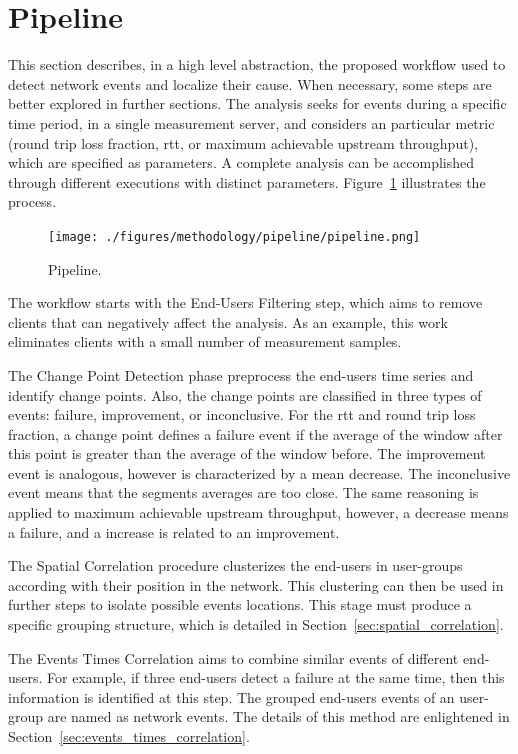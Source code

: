 \section{Pipeline}

This section describes, in a high level abstraction, the proposed workflow
used to detect network events and localize their cause. When necessary, some
steps are better explored in further sections.
The analysis seeks for events during a specific time period, in a single
measurement server, and considers an
particular metric (round trip loss fraction, \gls*{rtt}, or maximum achievable
upstream throughput),
which are specified as parameters.
A complete analysis can be accomplished through different
executions with distinct parameters.
Figure~\ref{fig:pipeline} illustrates the process.

\begin{figure}[H]
    \centering
    \texttt{[image: ./figures/methodology/pipeline/pipeline.png]}
    \caption{Pipeline.}
\label{fig:pipeline}
\end{figure}%

The workflow starts with the End-Users Filtering step,
which aims to remove clients that can negatively affect the analysis.
As an example, this work eliminates clients
with a small number of measurement samples.

The Change Point Detection phase preprocess the end-users time series and
identify change points.
Also, the change points are classified in three types of events: failure,
improvement, or inconclusive. For the \gls*{rtt} and round trip loss fraction,
a change point defines a
failure event if the average of the window after this point is greater than the
average of the window before. The improvement event is analogous, however is
characterized by a mean decrease.
The inconclusive event means that the segments averages are too close.
The same reasoning is applied to maximum
achievable upstream throughput, however, a decrease means a failure, and a
increase is related to an improvement.

The Spatial Correlation procedure clusterizes the end-users in user-groups
according with their position in the network. This clustering can then be used
in further steps to isolate possible events locations.
This stage must produce a specific grouping structure, which is detailed in
Section~\ref{sec:spatial_correlation}.

The Events Times Correlation aims to combine similar events of different
end-users. For example, if three end-users detect a failure at
the same time, then this information is identified at this step.
The grouped end-users events of an user-group are named as network events.
The details of this method are enlightened in
Section~\ref{sec:events_times_correlation}.

